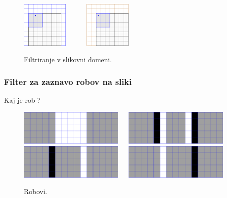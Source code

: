 \begin{primer}
\begin{figure}[htbp]
  \includegraphics[width=0.2\textwidth]{./slike-latex/filterMSI8}\ \ \ \ \ \ 
  \includegraphics[width=0.2\textwidth]{./slike-latex/filterMSI9}
  \caption{Filtriranje v slikovni domeni.}
  \label{fig:filtriranje}
\end{figure}

\end{primer}
%
\subsubsection{Filter za zaznavo robov na sliki}
Kaj je rob ?

%
\begin{figure}[htbp]
  \centering
  \includegraphics[width=0.45\textwidth]{./slike-latex/rob-slika}\ \ \ 
  \includegraphics[width=0.45\textwidth]{./slike-latex/rob-center}\\[0.5cm]
  \includegraphics[width=0.45\textwidth]{./slike-latex/rob-naprej}\ \ \ 
  \includegraphics[width=0.45\textwidth]{./slike-latex/rob-nazaj}
  \caption{Robovi.}
  \label{fig:robovi}
\end{figure}
%


